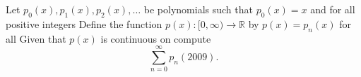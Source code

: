 Let $p_0(x),p_1(x),p_2(x),\ldots$ be polynomials such that $p_0(x)=x$ and for all positive integers    Define the function $p(x):[0,\infty)\to\mathbb{R}$ by $p(x)=p_n(x)$ for all   Given that $p(x)$ is continuous on  compute \[\sum_{n=0}^\infty p_n(2009).\]